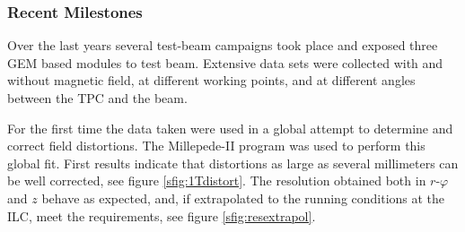 \subsubsection{Recent Milestones}
Over the last years several test-beam campaigns took place and exposed three GEM based modules to test beam. Extensive data sets were collected with and without magnetic field, at different working points, and at different angles between the TPC and the beam.

For the first time the data taken were used in a global attempt to determine and correct field distortions. The Millepede-II \cite{Blobel20065,millepedeWiki} program was used to perform this global fit. First results indicate that distortions as large as several millimeters can be well corrected, see figure \ref{sfig:1Tdistort}. The resolution obtained both in $r\text{-}\varphi$ and $z$ behave as expected, and, if extrapolated to the running conditions at the ILC, meet the requirements, see figure \ref{sfig:resextrapol}.

